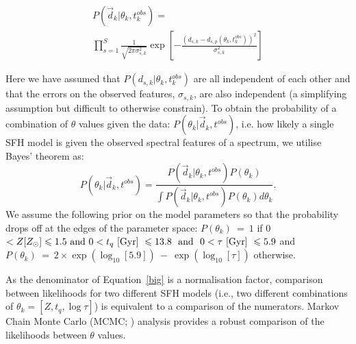 \documentclass[useAMS,usenatbib]{mn2e}
\begin{document}
\begin{multline}\label{like}
P(\vec{d}_{k}|\theta_k, t^{obs}_{k}) = \\ \prod_{s=1}^{S} \frac{1}{\sqrt{2\pi\sigma_{s, k}^2}} \exp{\left[ - \frac{(d_{s, k} - d_{s, p}(\theta_k, t_{k}^{obs}))^2}{\sigma_{s, k}^2} \right]}
\end{multline}

Here we have assumed that $P(d_{s, k}|\theta_k, t^{obs}_{k})$ are all independent of each other and that the errors on the observed features, $\sigma_{s, k}$, are also independent (a simplifying assumption but difficult to otherwise constrain). To obtain the probability of a combination of $\theta$ values given the data: $P(\theta_k|\vec{d}_k, t^{obs})$, i.e. how likely a single SFH model is  given the observed spectral features of a spectrum, we utilise Bayes' theorem as:
 \begin{equation}\label{big}
P(\theta_k|\vec{d}_k, t^{obs}) = \frac{P(\vec{d}_k|\theta_k, t^{obs})P(\theta_k)}{\int P(\vec{d}_k |\theta_k, t^{obs})P(\theta_k) d\theta_k}.
\end{equation}
We assume the following prior on the model parameters so that the probability drops off at the edges of the parameter space: ${P(\theta_k)~=~1}$ if 0 $< Z [Z_{\odot}] \leq 1.5 \text{ and } 0 < t_q ~\rm{[Gyr]}~ \leq 13.8 ~ \text{ and } ~ 0 < \tau  ~\rm{[Gyr]}~ \leq 5.9$ and ${P(\theta_k)~=~2\times\exp\left(\log_{10}[5.9]\right)~-~\exp\left(\log_{10}[\tau]\right)}$ otherwise.



As the denominator of Equation~\ref{big} is a normalisation factor, comparison between likelihoods for two different SFH models (i.e., two different combinations of $\theta_k = [Z, t_q, \log \tau]$) is equivalent to a comparison of the numerators. Markov Chain Monte Carlo (MCMC; \citealt{mackay03, emcee13, GW10}) analysis provides a robust comparison of the likelihoods between $\theta$ values.
\end{document}
